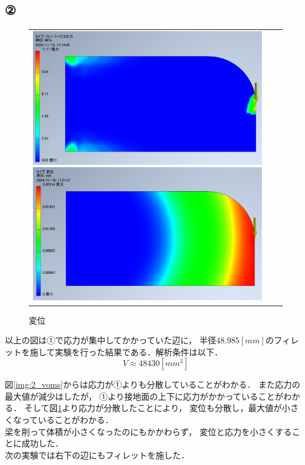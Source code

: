 \subsection{②}
  \begin{figure}[H]
    \begin{tabular}{ccc}
      \begin{minipage}{.5\textwidth}
        \centering
        \includegraphics[width=0.99\linewidth]{images/2_voms.png}
        \caption{応力}
        \label{img:2_voms}
      \end{minipage}
      \begin{minipage}{.5\textwidth}
        \centering
        \includegraphics[width=0.99\linewidth]{images/2_disp.png}
        \caption{変位}
        \label{img:2_disp}
      \end{minipage}
    \end{tabular}
  \end{figure}

  以上の図は①で応力が集中してかかっていた辺に，
  半径$48.985[mm]$のフィレットを施して実験を行った結果である．解析条件は以下．
  \begin{equation*}
    V \approx 48430[mm^3]
  \end{equation*}

  図\ref{img:2_voms}からは応力が①よりも分散していることがわかる．
  また応力の最大値が減少はしたが，
  ①より接地面の上下に応力がかかっていることがわかる．
  そして図\ref{img:2_disp}より応力が分散したことにより，
  変位も分散し，最大値が小さくなっていることがわかる．\\\indent
  梁を削って体積が小さくなったのにもかかわらず，
  変位と応力を小さくすることに成功した．\\\indent
  次の実験では右下の辺にもフィレットを施した．
